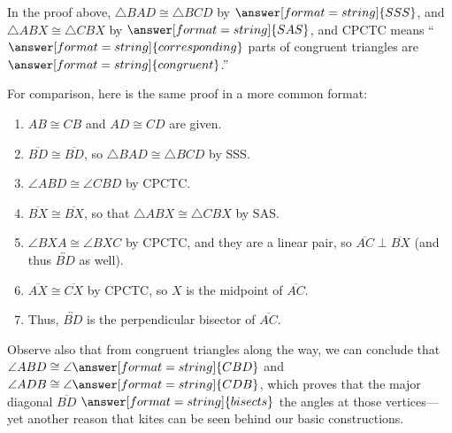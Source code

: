 \documentclass[nooutcomes]{ximera}
\begin{document}
\begin{problem}
\begin{problem}
\begin{image}
\end{image}
In the proof above, $\triangle BAD \cong \triangle BCD$ by $\answer[format=string]{SSS}$, and $\triangle ABX \cong \triangle CBX$ by $\answer[format=string]{SAS}$, and CPCTC means ``$\answer[format=string]{corresponding}$ parts of congruent triangles are $\answer[format=string]{congruent}$.''

\begin{problem}
For comparison, here is the same proof in a more common format:
\begin{enumerate}
\item $AB\cong CB$ and $AD\cong CD$ are given.  
\item $\overline{BD}\cong \overline{BD}$, so $\triangle BAD \cong \triangle BCD$ by SSS.  
\item $\angle ABD \cong \angle CBD$ by CPCTC. 
\item $\overline{BX}\cong \overline{BX}$, so that $\triangle ABX \cong \triangle CBX$ by SAS.  
\item $\angle BXA \cong \angle BXC$ by CPCTC, and they are a linear pair, 
so $\overline{AC}\perp\overline{BX}$ (and thus $\overleftrightarrow{BD}$ as well). 
\item $\overline{AX}\cong \overline{CX}$ by CPCTC, so $X$ is the midpoint of $\overline{AC}$.
\item Thus, $\overleftrightarrow{BD}$ is the perpendicular bisector of $\overline{AC}$.
\end{enumerate}

Observe also that from congruent triangles along the way, we can conclude that 
$\angle ABD\cong \angle \answer[format=string]{CBD}$ and $\angle ADB \cong \angle \answer[format=string]{CDB}$, 
which proves that the major diagonal $\overline{BD}$ $\answer[format=string]{bisects}$ the angles at those vertices---yet 
another reason that kites can be seen behind our basic constructions.  

\end{problem}

\end{problem}
\end{problem}
\end{document}
